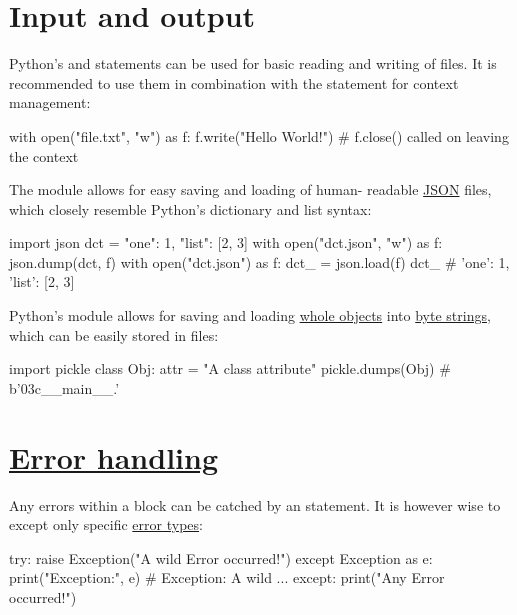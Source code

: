 \documentclass[rules]{cheatsheet}
\begin{document}
\section{Input and output}

Python's  and  statements can be used for basic reading and writing of files. It is recommended to use them in combination with the \href{https://docs.python.org/3/reference/compound_stmts.html#with}{} statement for context management:
\begin{python}
  with open("file.txt", "w") as f:
    f.write("Hello World!")
  # f.close() called on leaving the context
\end{python}

The \href{https://docs.python.org/3/library/json.html}{} module allows for easy saving and loading of human- readable \href{https://www.json.org/}{JSON} files, which closely resemble Python's dictionary and list syntax:
\begin{python}
  import json
  dct = {"one": 1, "list": [2, 3]}
  with open("dct.json", "w") as f:
    json.dump(dct, f)
  with open("dct.json") as f:
    dct_ = json.load(f)
  dct_ # {'one': 1, 'list': [2, 3]}
\end{python}

Python's \href{https://docs.python.org/3/library/pickle.html}{} module allows for saving and loading \href{https://docs.python.org/3/library/pickle.html#pickle-picklable}{whole objects} into \href{https://docs.python.org/3/library/stdtypes.html#bytes}{byte strings}, which can be easily stored in files:
\begin{python}
  import pickle
  class Obj:
    attr = "A class attribute"
  pickle.dumps(Obj) # b'\x03c__main__\nObj\nq{}.'
\end{python}

\section{\href{https://docs.python.org/3/tutorial/errors.html}{Error handling}}

Any errors within a \href{https://docs.python.org/3/reference/compound_stmts.html#try}{} block can be catched by an \href{https://docs.python.org/3/reference/compound_stmts.html#except}{} statement. It is however wise to except only specific \href{https://docs.python.org/3/library/exceptions.html#bltin-exceptions}{error types}:
\begin{python}
  try:
    raise Exception("A wild Error occurred!")
  except Exception as e:
    print("Exception:", e) # Exception: A wild ...
  except:
    print("Any Error occurred!")
\end{python}
\end{document}
